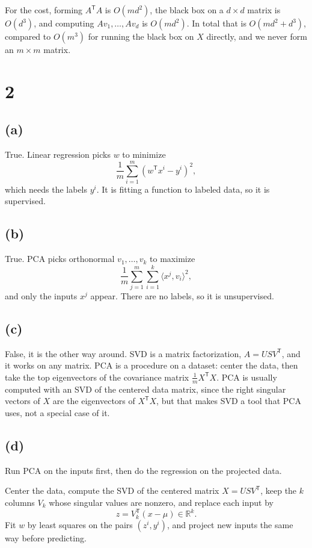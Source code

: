 \documentclass[11pt]{article}
\newcommand{\R}{\mathbb{R}}
\newcommand{\T}{\mathsf{T}}
\begin{document}
For the cost, forming $A^\T A$ is $O(md^2)$, the black box on a $d \times d$ matrix is $O(d^3)$, and computing $A v_1, \dots, A v_d$ is $O(md^2)$. In total that is $O(md^2 + d^3)$, compared to $O(m^3)$ for running the black box on $X$ directly, and we never form an $m \times m$ matrix.

\section*{2}

\subsection*{(a)}

True. Linear regression picks $w$ to minimize
\[
  \frac{1}{m} \sum_{i=1}^m \left( w^\T x^i - y^i \right)^2 ,
\]
which needs the labels $y^i$. It is fitting a function to labeled data, so it is supervised.

\subsection*{(b)}

True. PCA picks orthonormal $v_1, \dots, v_k$ to maximize
\[
  \frac{1}{m} \sum_{j=1}^m \sum_{i=1}^k \langle x^j, v_i \rangle^2 ,
\]
and only the inputs $x^j$ appear. There are no labels, so it is unsupervised.

\subsection*{(c)}

False, it is the other way around. SVD is a matrix factorization, $A = U S V^\T$, and it works on any matrix. PCA is a procedure on a dataset: center the data, then take the top eigenvectors of the covariance matrix $\frac{1}{m} X^\T X$. PCA is usually computed with an SVD of the centered data matrix, since the right singular vectors of $X$ are the eigenvectors of $X^\T X$, but that makes SVD a tool that PCA uses, not a special case of it.

\subsection*{(d)}

Run PCA on the inputs first, then do the regression on the projected data.

Center the data, compute the SVD of the centered matrix $X = U S V^\T$, keep the $k$ columns $V_k$ whose singular values are nonzero, and replace each input by
\[
  z = V_k^\T (x - \mu) \in \R^k .
\]
Fit $w$ by least squares on the pairs $(z^i, y^i)$, and project new inputs the same way before predicting.
\end{document}

